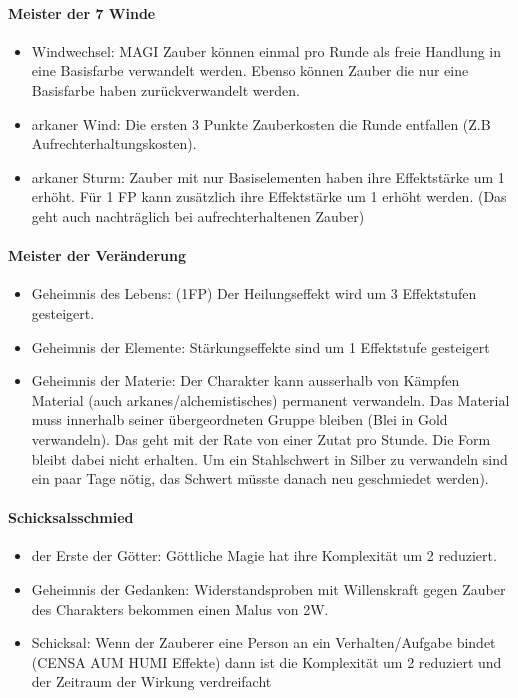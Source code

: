 \documentclass{article}
\begin{document}
\paragraph{Meister der 7 Winde}

\begin{itemize}
\item Windwechsel: MAGI Zauber können einmal pro Runde als freie Handlung in eine Basisfarbe verwandelt werden. Ebenso können Zauber die nur eine Basisfarbe haben zurückverwandelt werden.
\item arkaner Wind: Die ersten 3 Punkte Zauberkosten die Runde entfallen (Z.B Aufrechterhaltungskosten).
\item arkaner Sturm: Zauber mit nur Basiselementen haben ihre Effektstärke um 1 erhöht. Für 1 FP kann zusätzlich ihre Effektstärke um 1 erhöht werden. (Das geht auch nachträglich bei aufrechterhaltenen Zauber)
\end{itemize}

\paragraph{Meister der Veränderung}

\begin{itemize}
\item Geheimnis des Lebens: (1FP) Der Heilungseffekt wird um 3 Effektstufen gesteigert.
\item Geheimnis der Elemente: Stärkungseffekte sind um 1 Effektstufe gesteigert
\item Geheimnis der Materie: Der Charakter kann ausserhalb von Kämpfen Material (auch arkanes/alchemistisches) permanent verwandeln. Das Material muss innerhalb seiner übergeordneten Gruppe bleiben (Blei in Gold verwandeln). Das geht mit der Rate von einer Zutat pro Stunde. Die Form bleibt dabei nicht erhalten. Um ein Stahlschwert in Silber zu verwandeln sind ein paar Tage nötig, das Schwert müsste danach neu geschmiedet werden).
\end{itemize}

\paragraph{Schicksalsschmied}

\begin{itemize}
\item der Erste der Götter: Göttliche Magie hat ihre Komplexität um 2 reduziert.
\item Geheimnis der Gedanken: Widerstandsproben mit Willenskraft gegen Zauber des Charakters bekommen einen Malus von 2W.
\item Schicksal: Wenn der Zauberer eine Person an ein Verhalten/Aufgabe bindet (CENSA AUM HUMI Effekte) dann ist die Komplexität um 2 reduziert und der Zeitraum der Wirkung verdreifacht
\end{itemize}
\end{document}
